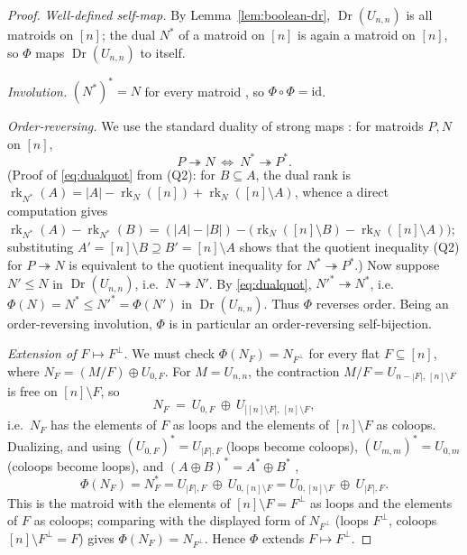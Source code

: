 \documentclass[11pt]{article}
\newcommand{\Dr}{\operatorname{Dr}}
\newcommand{\rk}{\operatorname{rk}}
\newcommand{\dual}[1]{#1^{\ast}}
\theoremstyle{definition}
\theoremstyle{remark}
\begin{document}
\begin{proof}
\emph{Well-defined self-map.} By Lemma~\ref{lem:boolean-dr}, $\Dr(U_{n,n})$ is all
matroids on $[n]$; the dual $\dual N$ of a matroid on $[n]$ is again a matroid on
$[n]$, so $\Phi$ maps $\Dr(U_{n,n})$ to itself.

\emph{Involution.} $\dual{(\dual N)}=N$ for every matroid \cite[Thm.~2.1.1]{OxleyMatroids},
so $\Phi\circ\Phi=\mathrm{id}$.

\emph{Order-reversing.} We use the standard duality of strong maps
\cite[\S7.3]{White}: for matroids $P,N$ on $[n]$,
\begin{equation}
P\twoheadrightarrow N\ \Longleftrightarrow\ \dual N\twoheadrightarrow \dual P.
\label{eq:dualquot}
\end{equation}
(Proof of \eqref{eq:dualquot} from (Q2): for $B\subseteq A$, the dual rank is
$\rk_{\dual N}(A)=|A|-\rk_N([n])+\rk_N([n]\setminus A)$, whence a direct computation
gives $\rk_{\dual N}(A)-\rk_{\dual N}(B)=(|A|-|B|)-\bigl(\rk_N([n]\setminus B)-\rk_N([n]\setminus A)\bigr)$;
substituting $A'=[n]\setminus B\supseteq B'=[n]\setminus A$ shows that the quotient
inequality (Q2) for $P\twoheadrightarrow N$ is equivalent to the quotient inequality
for $\dual N\twoheadrightarrow\dual P$.) Now suppose $N'\le N$ in $\Dr(U_{n,n})$, i.e.\
$N\twoheadrightarrow N'$. By \eqref{eq:dualquot}, $\dual{N'}\twoheadrightarrow\dual N$,
i.e.\ $\Phi(N)=\dual N\le \dual{N'}=\Phi(N')$ in $\Dr(U_{n,n})$. Thus $\Phi$ reverses
order. Being an order-reversing involution, $\Phi$ is in particular an
order-reversing self-bijection.

\emph{Extension of $F\mapsto F^{\perp}$.} We must check $\Phi(N_F)=N_{F^{\perp}}$ for
every flat $F\subseteq[n]$, where $N_F=(M/F)\oplus U_{0,F}$. For $M=U_{n,n}$, the
contraction $M/F=U_{n-|F|,\,[n]\setminus F}$ is free on $[n]\setminus F$, so
\[
N_F\ =\ U_{0,F}\ \oplus\ U_{|[n]\setminus F|,\,[n]\setminus F},
\]
i.e.\ $N_F$ has the elements of $F$ as loops and the elements of $[n]\setminus F$ as
coloops. Dualizing, and using $\dual{(U_{0,F})}=U_{|F|,F}$ (loops become coloops),
$\dual{(U_{m,m})}=U_{0,m}$ (coloops become loops), and
$\dual{(A\oplus B)}=\dual A\oplus\dual B$ \cite[\S2.1, \S4.2]{OxleyMatroids},
\[
\Phi(N_F)=\dual{N_F}
=U_{|F|,F}\ \oplus\ U_{0,[n]\setminus F}
=U_{0,[n]\setminus F}\ \oplus\ U_{|F|,F}.
\]
This is the matroid with the elements of $[n]\setminus F=F^{\perp}$ as loops and the
elements of $F$ as coloops; comparing with the displayed form of $N_{F^{\perp}}$
(loops $F^{\perp}$, coloops $[n]\setminus F^{\perp}=F$) gives
$\Phi(N_F)=N_{F^{\perp}}$. Hence $\Phi$ extends $F\mapsto F^{\perp}$.
\end{proof}
\end{document}
